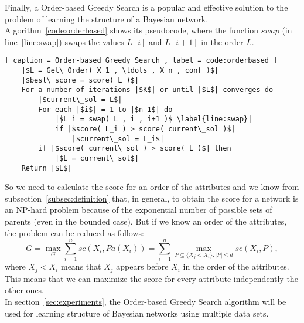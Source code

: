 Finally, a Order-based Greedy Search is a popular and effective solution to the problem of learning the structure of a Bayesian network. Algorithm~\ref{code:orderbased} shows its pseudocode, where the function ${swap}$ (in line~\ref{line:swap}) swaps the values $L[ i ]$ and $L[ i + 1 ]$ in the order $L$.

\begin{lstlisting}[ caption = Order-based Greedy Search , label = code:orderbased ]
	|$L = Get\_Order( X_1 , \ldots , X_n , conf )$|
	|$best\_score = score( L )$|
	For a number of iterations |$K$| or until |$L$| converges do
		|$current\_sol = L$|
		For each |$i$| = 1 to |$n-1$| do
			|$L_i = swap( L , i , i+1 )$ \label{line:swap}|
			if |$score( L_i ) > score( current\_sol )$|
				|$current\_sol = L_i$|
		if |$score( current\_sol ) > score( L )$| then
			|$L = current\_sol$|
	Return |$L$|
\end{lstlisting}
So we need to calculate the score for an order of the attributes and we know from subsection~\ref{subsec:definition} that, in general, to obtain the score for a network is an NP-hard problem because of the exponential number of possible sets of parents (even in the bounded case). But if we know an order of the attributes, the problem can be reduced as follows:
	\[ G = \max_G \sum_{i=1}^{n} {sc}( X_i , {Pa}( X_i ) ) = \sum_{i=1}^{n} \max_{P \subseteq \{ X_j < X_i \}:|P|\leq d} {sc}( X_i , P ) ,\]
where $X_j < X_i$ means that $X_j$ appears before $X_i$ in the order of the attributes. This means that we can maximize the score for every attribute independently the other ones.\\
In section~\ref{sec:experiments}, the Order-based Greedy Search algorithm will be used for learning structure of Bayesian networks using multiple data sets.
